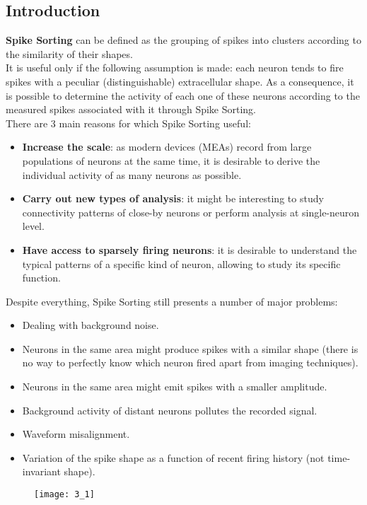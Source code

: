 \subsection{Introduction}
\textbf{Spike Sorting} can be defined as the grouping of spikes into clusters according
to the similarity of their shapes.\\
It is useful only if the following assumption is made: each neuron tends to fire spikes
with a peculiar (distinguishable) extracellular shape.
As a consequence, it is possible to determine the activity of each one of these neurons
according to the measured spikes associated with it through Spike Sorting.\\
There are 3 main reasons for which Spike Sorting useful:
\begin{itemize}
    \item \textbf{Increase the scale}: as modern devices (MEAs) record from large
          populations of neurons at the same time, it is desirable to derive the individual
          activity of as many neurons as possible.
    \item \textbf{Carry out new types of analysis}: it might be interesting to study
          connectivity patterns of close-by neurons or perform analysis at single-neuron
          level.
    \item \textbf{Have access to sparsely firing neurons}: it is desirable to understand
          the typical patterns of a specific kind of neuron, allowing to study its specific
          function.
\end{itemize}
Despite everything, Spike Sorting still presents a number of major problems:
\begin{itemize}
    \item Dealing with background noise.
    \item Neurons in the same area might produce spikes with a similar shape (there is
          no way to perfectly know which neuron fired apart from imaging techniques).
    \item Neurons in the same area might emit spikes with a smaller amplitude.
    \item Background activity of distant neurons pollutes the recorded signal.
    \item Waveform misalignment.
    \item Variation of the spike shape as a function of recent firing history
          (not time-invariant shape).
\end{itemize}
\begin{figure}[H]
    \texttt{[image: 3\_1]}
    \centering
\end{figure}

